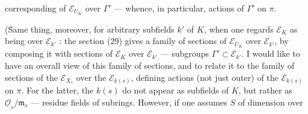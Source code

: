 corresponding of $\mathcal E_{U_K}$ over $\Gamma'$ --- whence, in particular, actions of $\Gamma'$ on $\pi$.

(\={Same} thing, moreover, for arbitrary subfields $k'$ of $K$, when one regards $\mathcal E_K$ as being over $\mathcal E_{k'}$ : the section (29) gives a family of sections of $\mathcal E_{U_K}$ over $\mathcal E_{k'}$,  by composing it with sections of $\mathcal E_K$ over $\mathcal E_{k'}$ --- subgroups $\Gamma'\subset\mathcal E_{k'}$. I would like to have an overall view of this family of sections, and to relate it to the family of sections of the $\mathcal E_{X_s}$ over the $\mathcal E_{k(s)}$,  defining  actions (not just outer) of the $\mathcal E_{k(s)}$ on $\pi$. For the latter, the $k(s)$ do not appear as subfields of $K$, but rather as $\underline{\mathcal O}_s/\mathfrak m_s$ --- residue fields of subrings. However, if one assumes $S$ of  dimension  over
